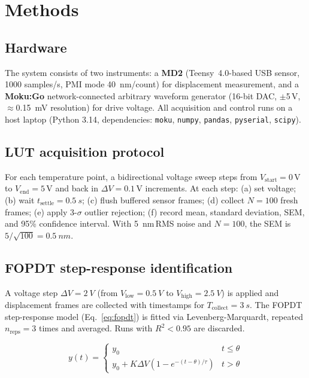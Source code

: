 \documentclass[fleqn,10pt]{wlscirep}
\begin{document}
\section*{Methods}

\subsection*{Hardware}

The system consists of two instruments: a \textbf{\textmu MD2} (Teensy~4.0-based USB sensor, 1000 samples/s, PMI mode \SI{40}{nm/count}) for displacement measurement, and a \textbf{Moku:Go} network-connected arbitrary waveform generator (16-bit DAC, $\pm$5\,V, $\approx$\SI{0.15}{mV} resolution) for drive voltage. All acquisition and control runs on a host laptop (Python 3.14, dependencies: \texttt{moku}, \texttt{numpy}, \texttt{pandas}, \texttt{pyserial}, \texttt{scipy}).

\subsection*{LUT acquisition protocol}

For each temperature point, a bidirectional voltage sweep steps from $V_\text{start} = 0$\,V to $V_\text{end} = 5$\,V and back in $\Delta V = 0.1$\,V increments. At each step: (a) set voltage; (b) wait $t_\text{settle} = \SI{0.5}{s}$; (c) flush buffered sensor frames; (d) collect $N = 100$ fresh frames; (e) apply 3-$\sigma$ outlier rejection; (f) record mean, standard deviation, SEM, and 95\% confidence interval. With \SI{5}{nm}\,RMS noise and $N = 100$, the SEM is $5/\sqrt{100} = \SI{0.5}{nm}$.

\subsection*{FOPDT step-response identification}

A voltage step $\Delta V = \SI{2}{V}$ (from $V_\text{low} = \SI{0.5}{V}$ to $V_\text{high} = \SI{2.5}{V}$) is applied and displacement frames are collected with timestamps for $T_\text{collect} = \SI{3}{s}$. The FOPDT step-response model (Eq.~\ref{eq:fopdt}) is fitted via Levenberg-Marquardt, repeated $n_\text{reps} = 3$ times and averaged. Runs with $R^2 < 0.95$ are discarded.

\begin{equation}
y(t) = \begin{cases} y_0 & t \leq \theta \\ y_0 + K \Delta V \left(1 - e^{-(t-\theta)/\tau}\right) & t > \theta \end{cases}
\label{eq:fopdt}
\end{equation}
\end{document}
